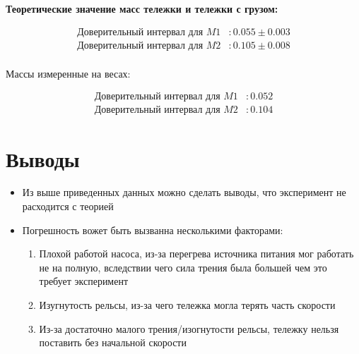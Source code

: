 \documentclass[a4paper]{article}
\begin{document}
\textbf{Теоретические значение масс тележки и тележки с грузом:}
\begin{center}
\begin{align*}
\text{Доверительный интервал для } M1 &: 0.055 \pm 0.003 \\
\text{Доверительный интервал для } M2 &: 0.105 \pm 0.008 \\
\end{align*}
\end{center}
Массы измеренные на весах:
\begin{center}
\begin{align*}
\text{Доверительный интервал для } M1 &: 0.052\\
\text{Доверительный интервал для } M2 &: 0.104
\end{align*}
\end{center}


\section{Выводы}

\begin{itemize}
	\item Из выше приведенных данных можно сделать выводы, что эксперимент не расходится с теорией
	\item Погрешность вожет быть вызванна несколькими факторами:
	\begin{enumerate}
		\item Плохой работой насоса, из-за перегрева источника питания мог работать не на полную, вследствии чего сила трения была большей чем это требует эксперимент
		\item Изугнутость рельсы, из-за чего тележка могла терять часть скорости
		\item Из-за достаточно малого трения/изогнутости рельсы, тележку нельзя поставить без начальной скорости
	\end{enumerate}
\end{itemize}
\end{document}
